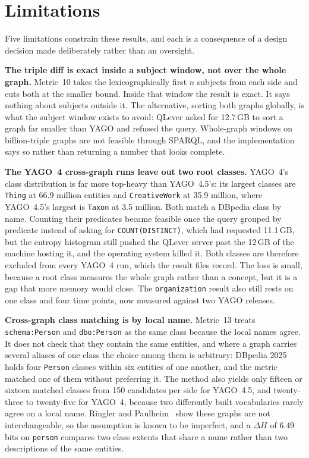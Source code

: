 \section{Limitations}
\label{sec:limitations}

Five limitations constrain these results, and each is a consequence of a design
decision made deliberately rather than an oversight.

\textbf{The triple diff is exact inside a subject window, not over the whole
graph.} Metric~10 takes the lexicographically first $n$ subjects from each side
and cuts both at the smaller bound. Inside that window the result is exact. It
says nothing about subjects outside it. The alternative, sorting both graphs
globally, is what the subject window exists to avoid: QLever asked for 12.7\,GB
to sort a graph far smaller than YAGO and refused the query. Whole-graph windows
on billion-triple graphs are not feasible through SPARQL, and the implementation
says so rather than returning a number that looks complete.

\textbf{The YAGO~4 cross-graph runs leave out two root classes.} YAGO~4's class
distribution is far more top-heavy than YAGO~4.5's: its largest classes are
\texttt{Thing} at 66.9 million entities and \texttt{CreativeWork} at 35.9
million, where YAGO~4.5's largest is \texttt{Taxon} at 3.5 million. Both match
a DBpedia class by name. Counting their predicates became feasible once the
query grouped by predicate instead of asking for \texttt{COUNT(DISTINCT)}, which
had requested 11.1\,GB, but the entropy histogram still pushed the QLever server
past the 12\,GB of the machine hosting it, and the operating system killed it.
Both classes are therefore excluded from every YAGO~4 run, which the result files
record. The loss is small, because a root class measures the whole graph rather
than a concept, but it is a gap that more memory would close. The
\texttt{organization} result also still rests on one class and four time points,
now measured against two YAGO releases.

\textbf{Cross-graph class matching is by local name.} Metric~13 treats
\texttt{schema:Person} and \texttt{dbo:Person} as the same class because the
local names agree. It does not check that they contain the same entities, and where a graph
carries several aliases of one class the choice among them is arbitrary: DBpedia
2025 holds four \texttt{Person} classes within six entities of one another, and
the metric matched one of them without preferring it. The method also yields only
fifteen or sixteen matched classes from 150 candidates per side for YAGO~4.5,
and twenty-three to twenty-five for YAGO~4, because two differently built
vocabularies rarely agree on a local name. Ringler
and Paulheim~\cite{ringler2017one} show these graphs are not interchangeable, so
the assumption is known to be imperfect, and a $\Delta H$ of 6.49 bits on
\texttt{person} compares two class extents that share a name rather than two
descriptions of the same entities.

